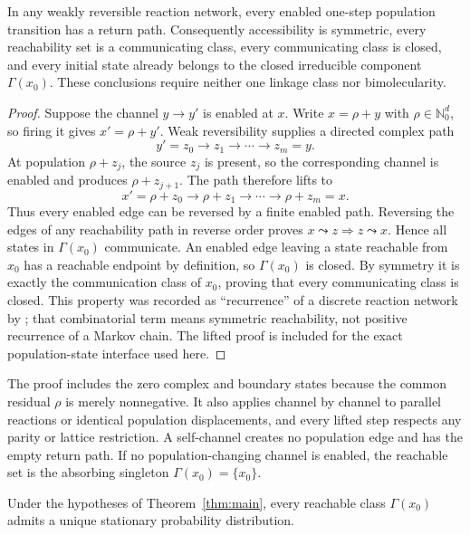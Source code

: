 \begin{lemma}\label{lem:state-cycle}
In any weakly reversible reaction network, every enabled one-step population
transition has a return path.  Consequently accessibility is symmetric,
every reachability set is a communicating class, every communicating class is
closed, and every initial state already belongs to the closed irreducible
component \(\Gamma(x_0)\).
These conclusions require neither one linkage class nor bimolecularity.
\end{lemma}

\begin{proof}
Suppose the channel \(y\to y'\) is enabled at \(x\).  Write \(x=\rho+y\) with
\(\rho\in\mathbb N_0^d\), so firing it gives \(x'=\rho+y'\).  Weak reversibility
supplies a directed complex path
\[
  y'=z_0\longrightarrow z_1\longrightarrow\cdots
      \longrightarrow z_m=y.
\]
At population \(\rho+z_j\), the source \(z_j\) is present, so the corresponding
channel is enabled and produces \(\rho+z_{j+1}\).  The path therefore lifts to
\[
  x'=\rho+z_0\longrightarrow \rho+z_1\longrightarrow\cdots
      \longrightarrow \rho+z_m=x.
\]
Thus every enabled edge can be reversed by a finite enabled path.  Reversing
the edges of any reachability path in reverse order proves
\(x\leadsto z\Rightarrow z\leadsto x\).  Hence all states in
\(\Gamma(x_0)\) communicate.  An enabled edge leaving a state reachable from
\(x_0\) has a reachable endpoint by definition, so \(\Gamma(x_0)\) is closed.
By symmetry it is exactly the communication class of \(x_0\), proving that
every communicating class is closed.
This property was recorded as ``recurrence'' of a discrete reaction network by
\citet[Lemmas~4.5--4.6]{PauleveCraciunKoeppl2014}; that combinatorial term
means symmetric reachability, not positive recurrence of a Markov chain.  The
lifted proof is included for the exact population-state interface used here.
\end{proof}

The proof includes the zero complex and boundary states because the common
residual \(\rho\) is merely nonnegative.  It also applies channel by channel to
parallel reactions or identical population displacements, and every lifted
step respects any parity or lattice restriction.  A self-channel creates no
population edge and has the empty return path.  If no population-changing
channel is enabled, the reachable set is the absorbing singleton
\(\Gamma(x_0)=\{x_0\}\).

\begin{corollary}\label{cor:stationary}
Under the hypotheses of Theorem~\ref{thm:main}, every reachable class
\(\Gamma(x_0)\) admits a unique stationary probability distribution.
\end{corollary}

